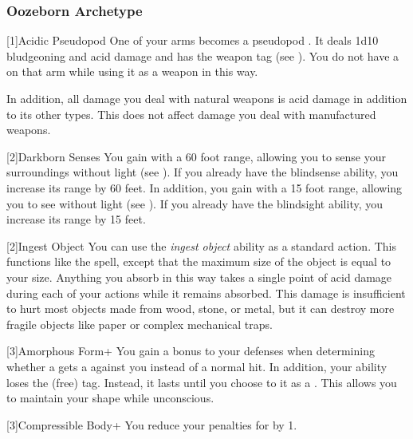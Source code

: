         \subsubsection{Oozeborn Archetype}

            [1]{Acidic Pseudopod} One of your arms becomes a pseudopod .
            It deals 1d10 bludgeoning and acid damage and has the  weapon tag (see ).
            You do not have a  on that arm while using it as a weapon in this way.

            In addition, all damage you deal with natural weapons is acid damage in addition to its other types.
            This does not affect damage you deal with manufactured weapons.

            [2]{Darkborn Senses} You gain  with a 60 foot range, allowing you to sense your surroundings without light (see ).
            If you already have the blindsense ability, you increase its range by 60 feet.
            In addition, you gain  with a 15 foot range, allowing you to see without light (see ).
            If you already have the blindsight ability, you increase its range by 15 feet.

            [2]{Ingest Object} You can use the \textit{ingest object} ability as a standard action.
            This functions like the  spell, except that the maximum size of the object is equal to your size.
            Anything you absorb in this way takes a single point of  acid damage during each of your actions while it remains absorbed.
            This damage is insufficient to hurt most objects made from wood, stone, or metal, but it can destroy more fragile objects like paper or complex mechanical traps.

            [3]{Amorphous Form+} You gain a  bonus to your defenses when determining whether a  gets a  against you instead of a normal hit.
            In addition, your  ability loses the  (free) tag.
            Instead, it lasts until you choose to  it as a .
            This allows you to maintain your shape while unconscious.

            [3]{Compressible Body+} You reduce your penalties for \squeezing by 1.


